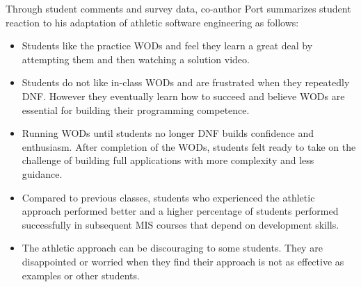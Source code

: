 Through student comments and survey data, co-author Port summarizes student reaction to his adaptation of athletic software engineering as follows:
\begin{itemize} 
\item Students like the practice WODs and feel they learn a great deal by attempting them and  then watching a solution video.
\item Students do not like in-class WODs and are frustrated when they repeatedly DNF. %
However they eventually learn how to succeed and believe WODs are essential for building their programming competence. %
\item Running WODs until students no longer DNF builds confidence and enthusiasm. After completion of the WODs, students felt ready to take on the challenge of building full applications with more complexity and less guidance. 
\item Compared to previous classes, students who experienced the athletic approach performed better and a higher percentage of students performed successfully in subsequent MIS courses that depend on development skills.  
\item The athletic approach can be discouraging to some students. They are disappointed or worried when they find their approach is not as effective as examples or other students.    
\end{itemize} 
